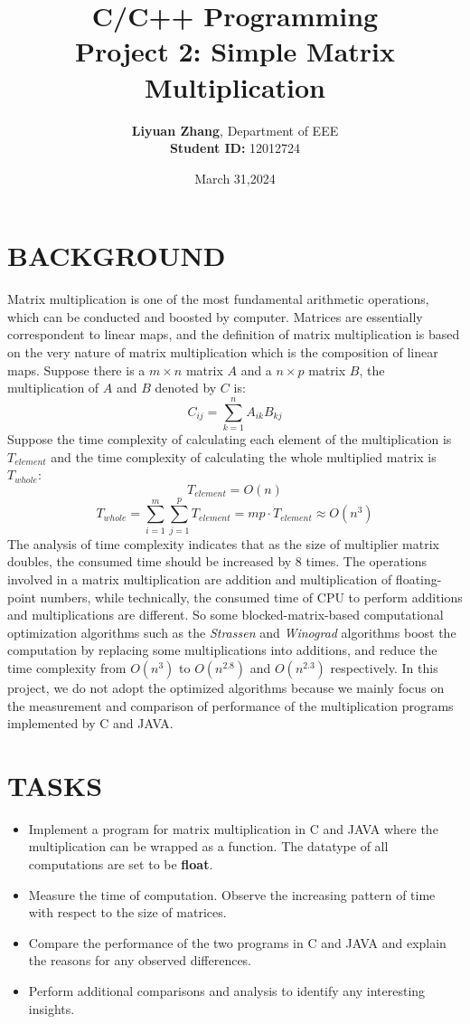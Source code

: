 \documentclass[12pt]{article}
\title{\textbf{C/C++ Programming\\ Project 2: Simple Matrix Multiplication}}
\author{\textbf{Liyuan Zhang}, Department of EEE\\\textbf{Student ID:} 12012724}
\date{March 31,2024}
\begin{document}
	\maketitle
	\newpage
	\section{BACKGROUND}
	Matrix multiplication is one of the most fundamental arithmetic operations, which can be conducted and boosted by computer. Matrices are essentially correspondent to linear maps, and the definition of matrix multiplication is based on the very nature of matrix multiplication which is the composition of linear maps. Suppose there is a $m\times n $ matrix $A$ and a $n\times p$ matrix $B$, the multiplication of $A$ and $B$ denoted by $C$ is:
	$$C_{ij} = \sum_{k=1}^{n}A_{ik}B_{kj}$$
	Suppose the time complexity of calculating each element of the multiplication is $T_{element}$ and the time complexity of calculating the whole multiplied matrix is $T_{whole}$:
	$$T_{element} = O(n)$$
	$$T_{whole} = \sum_{i=1}^{m}\sum_{j=1}^{p}T_{element} = mp\cdot T_{element}\approx O(n^3)$$
	The analysis of time complexity indicates that as the size of multiplier matrix doubles, the consumed time should be increased by 8 times. The operations involved in a matrix multiplication are addition and multiplication of floating-point numbers, while technically, the consumed time of CPU to perform additions and multiplications are different. So some blocked-matrix-based computational optimization algorithms such as the \textit{Strassen} and \textit{Winograd} algorithms boost the computation by replacing some multiplications into additions, and reduce the time complexity from $O(n^3)$ to $O(n^{2.8})$ and $O(n^{2.3})$ respectively. In this project, we do not adopt the optimized algorithms because we mainly focus on the measurement and comparison of performance of the multiplication programs implemented by C and JAVA.
	\section{TASKS}
	\begin{itemize}
		\item Implement a program for matrix multiplication in C and JAVA where the multiplication can be wrapped as a function. The datatype of all computations are set to be \textbf{float}.
		\item Measure the time of computation. Observe the increasing pattern of time with respect to the size of matrices.
		\item Compare the performance of the two programs in C and JAVA and explain the reasons for any observed differences.
		\item Perform additional comparisons and analysis to identify any interesting insights.
	\end{itemize}
\end{document}
